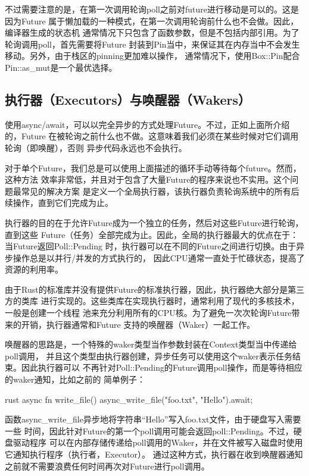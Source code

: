 不过需要注意的是，在第一次调用轮询poll之前对future进行移动是可以的。这是因为Future
属于懒加载的一种模式，在第一次调用轮询前什么也不会做。因此，编译器生成的状态机
通常情况下只包含了函数参数，但是不包括内部引用。为了轮询调用poll，首先需要将Future
封装到Pin当中，来保证其在内存当中不会发生移动。另外，由于栈区的pinning更加难以操作，
通常情况下，使用Box::Pin配合Pin::as\_mut是一个最优选择。

\subsection{执行器（Executors）与唤醒器（Wakers）}
使用async/await，可以以完全异步的方式处理Future。不过，正如上面所介绍的，Future
在被轮询之前什么也不做。这意味着我们必须在某些时候对它们调用轮询（即唤醒），否则
异步代码永远也不会执行。

对于单个Future，我们总是可以使用上面描述的循环手动等待每个future。然而，这种方法
效率非常低，并且对于包含了大量Future的程序来说也不实用。这个问题最常见的解决方案
是定义一个全局执行器，该执行器负责轮询系统中的所有后续操作，直到它们完成为止。

执行器的目的在于允许Future成为一个独立的任务，然后对这些Future进行轮询，直到这些
Future（任务）全部完成为止。因此，全局的执行器最大的优点在于：当Future返回Poll::Pending
时，执行器可以在不同的Future之间进行切换。由于异步操作总是以并行/并发的方式执行的，
因此CPU通常一直处于忙碌状态，提高了资源的利用率。

由于Rust的标准库并没有提供Future的标准执行器，因此，执行器绝大部分是第三方的类库
进行实现的。这些类库在实现执行器时，通常利用了现代的多核技术，一般是创建一个线程
池来充分利用所有的CPU核。为了避免一次次轮询Future带来的开销，执行器通常和Future
支持的唤醒器（Waker）一起工作。

唤醒器的思路是，一个特殊的waker类型当作参数封装在Context类型当中传递给poll调用，
并且这个类型由执行器创建，异步任务可以使用这个waker表示任务结束。因此执行器可以
不再针对Poll::Pending的Future调用poll操作，而是等待相应的waker通知，比如之前的
简单例子：
\begin{code-block}{rust}
async fn write_file() {
    async_write_file("foo.txt", "Hello").await;
}
\end{code-block}
函数async\_write\_file异步地将字符串“Hello”写入foo.txt文件，由于硬盘写入需要一些
时间，因此针对Future的第一个poll调用可能会返回poll::Pending。不过，硬盘驱动程序
可以在内部存储传递给poll调用的Waker，并在文件被写入磁盘时使用它通知执行程序（执行者，Executor）。
通过这种方式，执行器在收到唤醒器通知之前就不需要浪费任何时间再次对Future进行poll调用。

